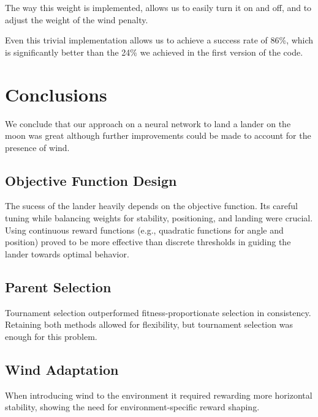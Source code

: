 \documentclass{article}
\begin{document}
The way this weight is implemented, allows us to easily turn it on and off, and to adjust the weight of the wind penalty.


Even this trivial implementation allows us to achieve a success rate of 86\%, which is significantly better than the 24\% we achieved in the first version of the code.


\section{Conclusions}

We conclude that our approach on a neural network to land a lander on the moon was great although further improvements could be made to account for the presence of wind.


\subsection{Objective Function Design}

The sucess of the lander heavily depends on the objective function. Its careful tuning while balancing weights for stability, positioning, and landing were crucial.
Using continuous reward functions (e.g., quadratic functions for angle and position) proved to be more effective than discrete thresholds in guiding the lander towards optimal behavior.

\subsection{Parent Selection}
Tournament selection outperformed fitness-proportionate selection in consistency. Retaining both methods allowed for flexibility, but tournament selection was enough for this problem.

\subsection{Wind Adaptation}
When introducing wind to the environment it required rewarding more horizontal stability, showing the need for environment-specific reward shaping.
\end{document}
